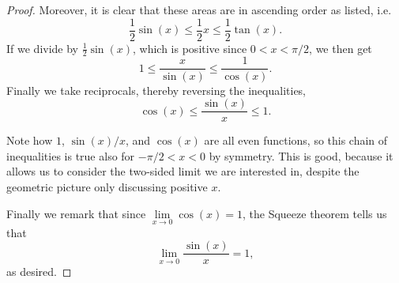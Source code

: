 \begin{proof}
	\noindent
	Moreover, it is clear that these areas are in ascending order as listed, i.e.
	\[
		\frac{1}{2} \sin(x) \leq \frac{1}{2} x \leq \frac{1}{2} \tan(x).
	\]
	If we divide by $\frac{1}{2} \sin(x)$, which is positive since $0 < x < \pi / 2$, we then get
	\[
		1 \leq \frac{x}{\sin(x)} \leq \frac{1}{\cos(x)}.
	\]
	Finally we take reciprocals, thereby reversing the inequalities,
	\[
		\cos(x) \leq \frac{\sin(x)}{x} \leq 1.
	\]

	\noindent
	Note how $1$, $\sin(x) / x$, and $\cos(x)$ are all even functions, so this chain of inequalities is true also for $-\pi / 2 < x < 0$ by symmetry.
	This is good, because it allows us to consider the two-sided limit we are interested in, despite the geometric picture only discussing positive $x$.

	Finally we remark that since $\lim\limits_{x \to 0} \cos(x) = 1$, the Squeeze theorem tells us that
	\[
		\lim_{x \to 0} \frac{\sin(x)}{x} = 1,
	\]
	as desired.
\end{proof}
